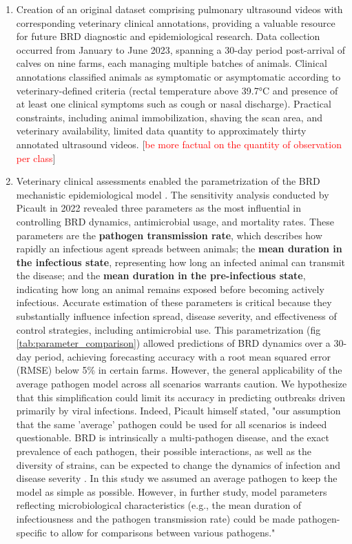 \begin{enumerate}
    \item Creation of an original dataset comprising pulmonary ultrasound videos with corresponding veterinary clinical annotations, providing a valuable resource for future BRD diagnostic and epidemiological research. Data collection occurred from January to June 2023, spanning a 30-day period post-arrival of calves on nine farms, each managing multiple batches of animals. Clinical annotations classified animals as symptomatic or asymptomatic according to veterinary-defined criteria (rectal temperature above 39.7°C and presence of at least one clinical symptoms such as cough or nasal discharge). Practical constraints, including animal immobilization, shaving the scan area, and veterinary availability, limited data quantity to approximately thirty annotated ultrasound videos. [\textcolor{red}{be more factual on the quantity of observation per class}]

    \item Veterinary clinical assessments enabled the parametrization of the BRD mechanistic epidemiological model \cite{picault_modelling_2022}. The sensitivity analysis conducted by Picault in 2022 revealed three parameters as the most influential in controlling BRD dynamics, antimicrobial usage, and mortality rates. These parameters are the \textbf{ pathogen transmission rate}, which describes how rapidly an infectious agent spreads between animals; the \textbf{mean duration in the infectious state}, representing how long an infected animal can transmit the disease; and the \textbf{mean duration in the pre-infectious state}, indicating how long an animal remains exposed before becoming actively infectious. Accurate estimation of these parameters is critical because they substantially influence infection spread, disease severity, and effectiveness of control strategies, including antimicrobial use. This parametrization (fig \ref{tab:parameter_comparison}) allowed predictions of BRD dynamics over a 30-day period, achieving forecasting accuracy with a root mean squared error (RMSE) below 5\% in certain farms. However, the general applicability of the average pathogen model across all scenarios warrants caution. We hypothesize that this simplification could limit its accuracy in predicting outbreaks driven primarily by viral infections. Indeed, Picault himself stated, "our assumption that the same 'average' pathogen could be used for all scenarios is indeed questionable. BRD is intrinsically a multi-pathogen disease, and the exact prevalence of each pathogen, their possible interactions, as well as the diversity of strains, can be expected to change the dynamics of infection and disease severity \cite{Kudirkiene2021, Becker2020}. In this study we assumed an average pathogen to keep the model as simple as possible. However, in further study, model parameters reflecting microbiological characteristics (e.g., the mean duration of infectiousness and the pathogen transmission rate) could be made pathogen-specific to allow for comparisons between various pathogens."


\end{enumerate}
